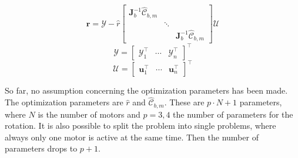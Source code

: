 \begin{equation}
\label{eqn_obj_stacked}
\mathbf{r} = \mathcal{Y} - \hat{r} \left[ \begin{array}{ccc}
\mathbf{J}_b^{-1} \hat{\mathcal{C}}_{b,m} & & \\ 
& \ddots & \\ 
& & \mathbf{J}_b^{-1} \hat{\mathcal{C}}_{b,m}
\end{array} \right]
\mathcal{U}
\end{equation}
\begin{equation}
\mathcal{Y} = \left[ \begin{array}{ccc}
\mathcal{Y}_1^\top & \cdots & \mathcal{Y}_n^\top
\end{array} \right]^\top
\end{equation}
\begin{equation}
\mathcal{U} = \left[ \begin{array}{ccc}
\mathbf{u}_1^\top & \cdots & \mathbf{u}_n^\top
\end{array} \right]^\top
\end{equation}


So far, no assumption concerning the optimization parameters has been made. The optimization parameters are $\hat{r}$ and $\hat{\mathcal{C}}_{b,m}$. These are $p\cdot N+1$ parameters, where $N$ is the number of motors and $p = {3,4}$ the number of parameters for the rotation. It is also possible to split the problem into single problems, where always only one motor is active at the same time. Then the number of parameters drops to $p+1$.